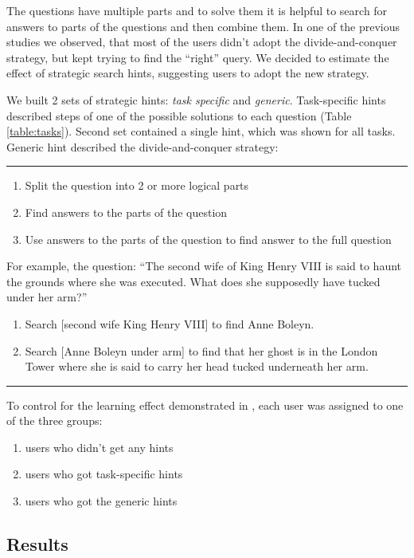 The questions have multiple parts and to solve them it is helpful to search for answers to parts of the questions and then combine them.
In one of the previous studies we observed, that most of the users didn't adopt the divide-and-conquer strategy, but kept trying to find the ``right'' query.
We decided to estimate the effect of strategic search hints, suggesting users to adopt the new strategy.

We built 2 sets of strategic hints: \textit{task specific} and \textit{generic}.
Task-specific hints described steps of one of the possible solutions to each question (Table \ref{table:tasks}).
Second set contained a single hint, which was shown for all tasks. Generic hint described the divide-and-conquer strategy:\\
\hrule
\begin{enumerate} \itemsep0pt \parskip0pt 
\item Split the question into 2 or more logical parts
\item Find answers to the parts of the question
\item Use answers to the parts of the question to find answer to the full question
\end{enumerate}

For example, the question: ``The second wife of King Henry VIII is said to haunt the grounds where she was executed. What does she supposedly have tucked under her arm?''
\begin{enumerate} \itemsep0pt \parskip0pt 
\item Search [second wife King Henry VIII] to find Anne Boleyn.
\item Search [Anne Boleyn under arm] to find that her ghost is in the London Tower where she is said to carry her head tucked underneath her arm.
\end{enumerate}
\hrule

To control for the learning effect demonstrated in \cite{Moraveji:2011:MIU:2009916.2009966}, each user was assigned to one of the three groups:
\begin{enumerate}\itemsep0pt \parskip0pt 
\item users who didn't get any hints
\item users who got task-specific hints
\item users who got the generic hints
\end{enumerate}


\subsection{Results}

